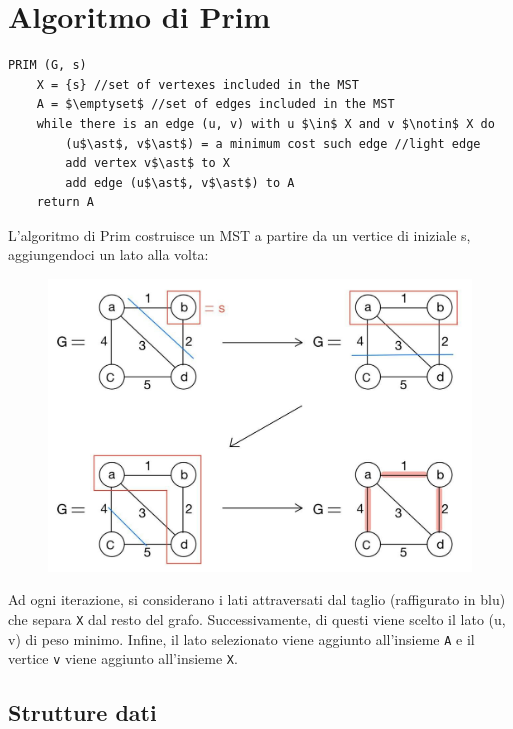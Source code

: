 \section{Algoritmo di Prim}\label{prim}
\begin{lstlisting}[mathescape=true]
PRIM (G, s)
	X = {s} //set of vertexes included in the MST
	A = $\emptyset$ //set of edges included in the MST
	while there is an edge (u, v) with u $\in$ X and v $\notin$ X do
		(u$\ast$, v$\ast$) = a minimum cost such edge //light edge
		add vertex v$\ast$ to X
		add edge (u$\ast$, v$\ast$) to A
	return A	

\end{lstlisting}
L'algoritmo di Prim costruisce un MST a partire da un vertice di iniziale s, aggiungendoci un lato alla volta:
\begin{figure}[H]
	\centering\includegraphics[width=15cm]{Img/prim.jpg}
\end{figure}
Ad ogni iterazione, si considerano i lati attraversati dal taglio (raffigurato in blu) che separa \texttt{X} dal resto del grafo. Successivamente, di questi viene scelto il lato (u, v) di peso minimo. Infine, il lato selezionato viene aggiunto all'insieme \texttt{A} e il vertice \texttt{v} viene aggiunto all'insieme \texttt{X}.

\subsection{Strutture dati}
